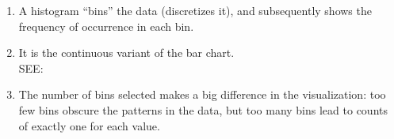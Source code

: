 \begin{table}[H]
\begin{minipage}[t]{0.57\linewidth}
\begin{enumerate}
    \item A histogram “bins” the data (discretizes it), and subsequently shows the frequency of occurrence in each bin. \hfill \cite{statistics/book/Statistics-for-Data-Scientists/Maurits-Kaptein}
    
    \item It is the continuous variant of the bar chart. \hfill \cite{statistics/book/Statistics-for-Data-Scientists/Maurits-Kaptein}\\
    SEE: 
    
    \item The number of bins selected makes a big difference in the visualization: too few bins obscure the patterns in the data, but too many bins lead to counts of exactly one for each value. \hfill \cite{statistics/book/Statistics-for-Data-Scientists/Maurits-Kaptein}
\end{enumerate}

\end{minipage}
\end{table}
